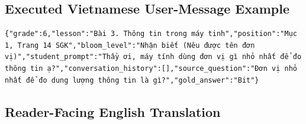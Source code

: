 \documentclass[conference]{IEEEtran}
\begin{document}
\subsection{Executed Vietnamese User-Message Example}
\begin{Verbatim}[breaklines=true,breakanywhere=true,fontsize=\scriptsize,formatcom=\rmfamily]
{"grade":6,"lesson":"Bài 3. Thông tin trong máy tinh","position":"Mục 1, Trang 14 SGK","bloom_level":"Nhận biết (Nêu được tên đơn vị)","student_prompt":"Thầy ơi, máy tính dùng đơn vị gì nhỏ nhất để đo thông tin ạ?","conversation_history":[],"source_question":"Đơn vị nhỏ nhất để đo dung lượng thông tin là gì?","gold_answer":"Bit"}
\end{Verbatim}
\subsection{Reader-Facing English Translation}
\end{document}
